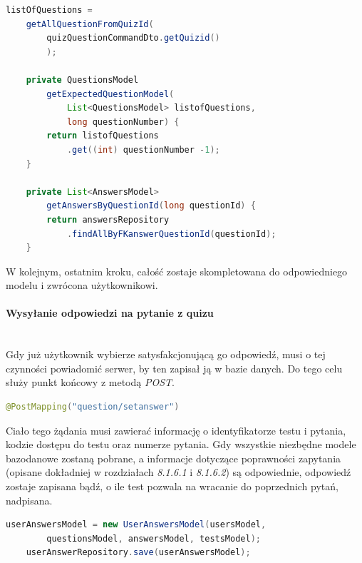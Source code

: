 \documentclass[twoside]{projektInzynierskiMS}
\numberwithin{figure}{section}
\begin{document}
\begin{lstlisting}[language=Java,caption=Pobranie pytania oraz możliwych odpowiedzi z bazy danych. Źródło: Opracowanie własne.,captionpos=b]
    listOfQuestions = 
    getAllQuestionFromQuizId(
        quizQuestionCommandDto.getQuizid()
        );
    
    private QuestionsModel 
        getExpectedQuestionModel(
            List<QuestionsModel> listofQuestions, 
            long questionNumber) {
        return listofQuestions
            .get((int) questionNumber -1);
    }
    
    private List<AnswersModel> 
        getAnswersByQuestionId(long questionId) {
        return answersRepository
            .findAllByFKanswerQuestionId(questionId);
    }
\end{lstlisting}
W kolejnym, ostatnim kroku, całość zostaje skompletowana do odpowiedniego modelu i zwrócona użytkownikowi.

\paragraph{Wysyłanie odpowiedzi na pytanie z quizu}
\mbox{} \\ \indent
Gdy już użytkownik wybierze satysfakcjonującą go odpowiedź, musi o tej czynności powiadomić serwer, by ten zapisał ją w bazie danych. Do tego celu służy punkt końcowy z metodą \textit{POST}.

\begin{lstlisting}[language=Java,caption=Deklaracja metody POST oraz punktu końcowego. Źródło: Opracowanie własne.,captionpos=b]
    @PostMapping("question/setanswer")
\end{lstlisting}
Ciało tego żądania musi zawierać informację o identyfikatorze testu i pytania, kodzie dostępu do testu oraz numerze pytania. Gdy wszystkie niezbędne modele bazodanowe zostaną pobrane, a informacje dotyczące poprawności zapytania (opisane dokładniej w rozdziałach \textit{8.1.6.1} i \textit{8.1.6.2}) są odpowiednie, odpowiedź zostaje zapisana bądź, o ile test pozwala na wracanie do poprzednich pytań, nadpisana.
\begin{lstlisting}[language=Java,caption=Zapisanie odpowiedzi na dane pytanie w bazie danych. Źródło: Opracowanie własne.,captionpos=b]
    userAnswersModel = new UserAnswersModel(usersModel,
        questionsModel, answersModel, testsModel);
    userAnswerRepository.save(userAnswersModel);
\end{lstlisting}
\end{document}
